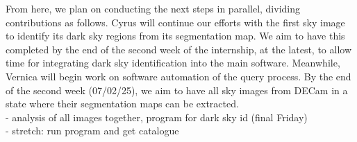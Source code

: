\documentclass[11pt]{article}
\begin{document}
From here, we plan on conducting the next steps in parallel, dividing contributions as follows. Cyrus will continue our efforts with the first sky image to identify its dark sky regions from its segmentation map. We aim to have this completed by the end of the second week of the internship, at the latest, to allow time for integrating dark sky identification into the main software. Meanwhile, Vernica will begin work on software automation of the query process. By the end of the second week (07/02/25), we aim to have all sky images from DECam in a state where their segmentation maps can be extracted. \\

- analysis of all images together, program for dark sky id (final Friday) \\
- stretch: run program and get catalogue 

\printbibliography
\end{document}
